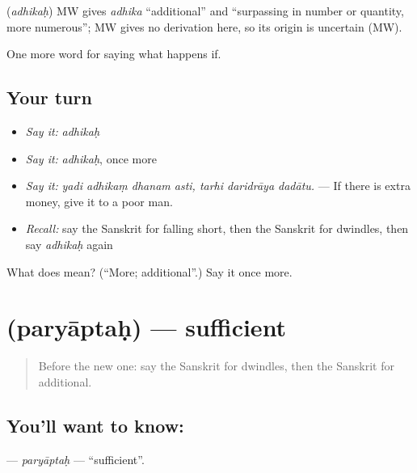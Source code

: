 \begin{cousinweb}
\textbf{} (\emph{adhikaḥ}) MW gives \emph{adhika} \textquotedblleft{}additional\textquotedblright{} and \textquotedblleft{}surpassing in number or quantity, more numerous\textquotedblright{}; MW gives no derivation here, so its origin is uncertain (MW).
\end{cousinweb}

\begin{grammarlens}[title={What you've built}]
One more word for saying what happens if.
\end{grammarlens}

\subsection*{Your turn}
\begin{itemize}
\raggedright
  \item \emph{Say it:} \emph{adhikaḥ}
  \item \emph{Say it:} \emph{adhikaḥ}, once more
  \item \emph{Say it:} \emph{yadi adhikaṃ dhanam asti, tarhi daridrāya dadātu.} — If there is extra money, give it to a poor man.
  \item \emph{Recall:} say the Sanskrit for falling short, then the Sanskrit for dwindles, then say \emph{adhikaḥ} again
\end{itemize}

\begin{tcolorbox}[breakable,colback=teal!4,colframe=teal!35!black,title={Before you move on}]
What does  mean? (\textquotedblleft{}More; additional\textquotedblright{}.) Say it once more.
\end{tcolorbox}
\section[\texorpdfstring{\sk{पर्याप्तः} (paryāptaḥ)}{पर्याप्तः (paryāptaḥ)}]{ (paryāptaḥ) — sufficient}

\label{lesson:SA-C379-paryaptah}



\begin{quote}
Before the new one: say the Sanskrit for dwindles, then the Sanskrit for additional.
\end{quote}

\subsection*{You'll want to know: }
\textbf{} — \emph{paryāptaḥ} — \textquotedblleft{}sufficient\textquotedblright{}.

